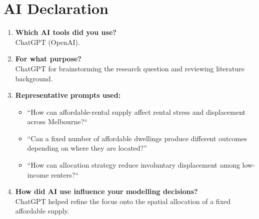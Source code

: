 \documentclass[10pt,a4paper]{article}
\begin{document}
\section*{AI Declaration}

\begin{enumerate}
    \item \textbf{Which AI tools did you use?}\\
    ChatGPT (OpenAI).

    \item \textbf{For what purpose?}\\
    ChatGPT for brainstorming the research question and reviewing literature background.

    \item \textbf{Representative prompts used:}
    \begin{itemize}[noitemsep]
        \item ``How can affordable-rental supply affect rental stress and displacement across Melbourne?``
        \item ``Can a fixed number of affordable dwellings produce different outcomes depending on where they are located?''
        \item ``How can allocation strategy reduce involuntary displacement among low-income renters?``
    \end{itemize}

    \item \textbf{How did AI use influence your modelling decisions?}\\
    ChatGPT helped refine the focus onto the spatial allocation of a fixed affordable supply.

\end{enumerate}
\end{document}
